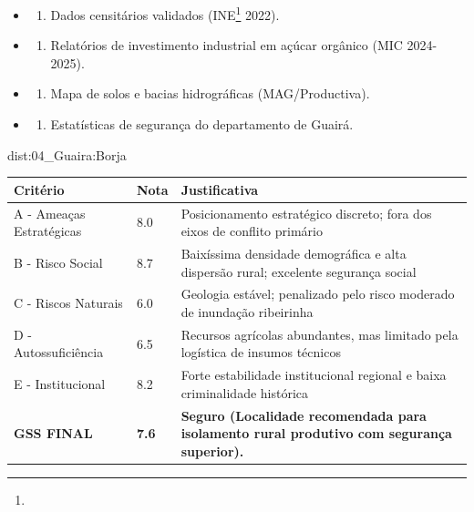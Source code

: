 {\begin{itemize}
\tightlist
\item
  \begin{enumerate}
  \def\labelenumi{\arabic{enumi})}
  \tightlist
  \item
    Dados censitários validados (INE\footnote{\fineINE} 2022).
  \end{enumerate}
\item
  \begin{enumerate}
  \def\labelenumi{\arabic{enumi})}
  \setcounter{enumi}{1}
  \tightlist
  \item
    Relatórios de investimento industrial em açúcar orgânico (MIC
    2024-2025).
  \end{enumerate}
\item
  \begin{enumerate}
  \def\labelenumi{\arabic{enumi})}
  \setcounter{enumi}{2}
  \tightlist
  \item
    Mapa de solos e bacias hidrográficas (MAG/\allowbreak Productiva).
  \end{enumerate}
\item
  \begin{enumerate}
  \def\labelenumi{\arabic{enumi})}
  \setcounter{enumi}{3}
  \tightlist
  \item
    Estatísticas de segurança do departamento de Guairá.
  \end{enumerate}
\end{itemize}}{dist:04_Guaira:Borja}
\begin{table}[ht!]
\small \begin{tabular}{p{3.0cm}p{0.8cm}p{6.0cm}} \toprule
\textbf{Critério} & \textbf{Nota} & \textbf{Justificativa} \\ \midrule
A - Ameaças Estratégicas & 8.0 & Posicionamento estratégico discreto; fora dos eixos de conflito primário \\
B - Risco Social & 8.7 & Baixíssima densidade demográfica e alta dispersão rural; excelente segurança social \\
C - Riscos Naturais & 6.0 & Geologia estável; penalizado pelo risco moderado de inundação ribeirinha \\
D - Autossuficiência & 6.5 & Recursos agrícolas abundantes, mas limitado pela logística de insumos técnicos \\
E - Institucional & 8.2 & Forte estabilidade institucional regional e baixa criminalidade histórica \\
\midrule \textbf{GSS FINAL} & \textbf{7.6} & \textbf{Seguro (Localidade recomendada para isolamento rural produtivo com segurança superior).} \\ \bottomrule \end{tabular}
\end{table}
